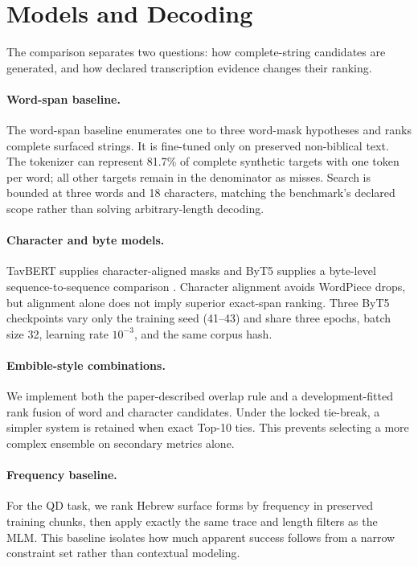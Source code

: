 \documentclass[10pt,twocolumn,a4paper]{article}
\begin{document}
\section{Models and Decoding}

The comparison separates two questions: how complete-string candidates are generated, and how declared transcription evidence changes their ranking.

\paragraph{Word-span baseline.}
The word-span baseline enumerates one to three word-mask hypotheses and ranks complete surfaced strings. It is fine-tuned only on preserved non-biblical text. The tokenizer can represent 81.7\% of complete synthetic targets with one token per word; all other targets remain in the denominator as misses. Search is bounded at three words and 18 characters, matching the benchmark's declared scope rather than solving arbitrary-length decoding.

\paragraph{Character and byte models.}
TavBERT supplies character-aligned masks and ByT5 supplies a byte-level sequence-to-sequence comparison \cite{raffel2020}. Character alignment avoids WordPiece drops, but alignment alone does not imply superior exact-span ranking. Three ByT5 checkpoints vary only the training seed (41--43) and share three epochs, batch size 32, learning rate $10^{-3}$, and the same corpus hash.

\paragraph{Embible-style combinations.}
We implement both the paper-described overlap rule and a development-fitted rank fusion of word and character candidates. Under the locked tie-break, a simpler system is retained when exact Top-10 ties. This prevents selecting a more complex ensemble on secondary metrics alone.

\paragraph{Frequency baseline.}
For the QD task, we rank Hebrew surface forms by frequency in preserved training chunks, then apply exactly the same trace and length filters as the MLM. This baseline isolates how much apparent success follows from a narrow constraint set rather than contextual modeling.
\end{document}
